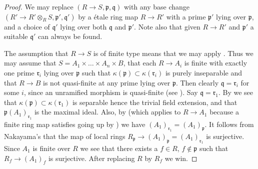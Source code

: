 \begin{proof}
We may replace $(R \to S, \mathfrak p, \mathfrak q)$
with any base change $(R' \to R'\otimes_R S, \mathfrak p', \mathfrak q')$
by a \'etale ring map $R \to R'$ with a prime $\mathfrak p'$
lying over $\mathfrak p$, and a choice of $\mathfrak q'$ lying over
both $\mathfrak q$ and $\mathfrak p'$. Note also that given
$R \to R'$ and $\mathfrak p'$ a suitable $\mathfrak q'$ can always
be found.

\medskip\noindent
The assumption that $R \to S$ is of finite type means that we may apply
. Thus we may
assume that $S = A_1 \times \ldots \times A_n \times B$, that
each $R \to A_i$ is finite with exactly one prime $\mathfrak r_i$
lying over $\mathfrak p$ such that
$\kappa(\mathfrak p) \subset \kappa(\mathfrak r_i)$ is purely inseparable
and that $R \to B$ is not quasi-finite at any prime lying over $\mathfrak p$.
Then clearly $\mathfrak q = \mathfrak r_i$ for some $i$, since
an unramified morphism is quasi-finite
(see ).
Say $\mathfrak q = \mathfrak r_1$.
By  we see that
$\kappa(\mathfrak p) \subset \kappa(\mathfrak r_1)$
is separable hence the trivial field extension, and that
$\mathfrak p(A_1)_{\mathfrak r_1}$ is the maximal ideal.
Also, by 
(which applies to $R \to A_1$ because a finite ring map satisfies going up by
)
we have $(A_1)_{\mathfrak r_1} = (A_1)_{\mathfrak p}$.
It follows from Nakayama's 
that the map of local rings
$R_{\mathfrak p} \to (A_1)_{\mathfrak p} = (A_1)_{\mathfrak r_1}$
is surjective. Since $A_1$ is finite over $R$ we see that there
exists a $f \in R$, $f \not \in \mathfrak p$ such that
$R_f \to (A_1)_f$ is surjective. After replacing $R$ by $R_f$ we win.
\end{proof}

